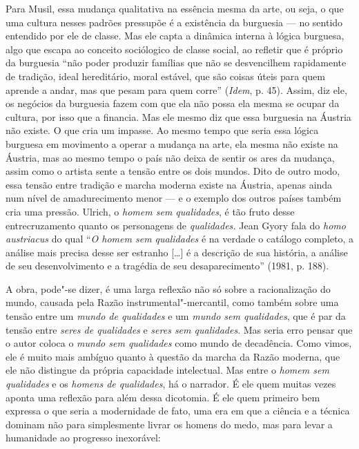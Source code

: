 Para Musil, essa mudança qualitativa na essência mesma da arte, ou seja,
o que uma cultura nesses padrões pressupõe é a existência da burguesia
--- no sentido entendido por ele de classe. Mas ele capta a dinâmica
interna à lógica burguesa, algo que escapa ao conceito sociólogico de classe
social, ao refletir que é próprio da burguesia ``não poder produzir famílias que
não se desvencilhem rapidamente de tradição, ideal hereditário, moral estável,
que são coisas úteis para quem aprende a andar, mas que pesam para quem
corre'' (\emph{Idem}, p. 45). Assim, diz ele, os negócios da burguesia
fazem com que ela não possa ela mesma se ocupar da cultura, por isso que
a financia. Mas ele mesmo diz que essa burguesia na Áustria não existe.
O que cria um impasse. Ao mesmo tempo que seria essa lógica burguesa em
movimento a operar a mudança na arte, ela mesma não existe na Áustria,
mas ao mesmo tempo o país não deixa de sentir os ares da mudança, assim
como o artista sente a tensão entre os dois mundos. Dito de outro modo,
essa tensão entre tradição e marcha moderna existe na Áustria, apenas
ainda num nível de amadurecimento menor --- e o exemplo dos outros países
também cria uma pressão. Ulrich, o \emph{homem sem qualidades}, é tão
fruto desse entrecruzamento quanto os personagens de \emph{qualidades.}
Jean Gyory fala do \emph{homo austriacus} do qual ``\emph{O homem sem
qualidades} é na verdade o catálogo completo, a análise mais precisa
desse ser estranho [\ldots{}] é a descrição de sua história, a
análise de seu desenvolvimento e a tragédia de seu desaparecimento''
(1981, p. 188).

A obra, pode"-se dizer, é uma larga reflexão não só sobre a
racionalização do mundo, causada pela Razão instrumental"-mercantil, como
também sobre uma tensão entre um \emph{mundo de qualidades} e um
\emph{mundo sem qualidades}, que é par da tensão entre \emph{seres de
qualidades} e \emph{seres sem qualidades}. Mas seria erro pensar que o
autor coloca o \emph{mundo sem qualidades} como mundo de decadência.
Como vimos, ele é muito mais ambíguo quanto à questão da marcha da Razão
moderna, que ele não distingue da própria capacidade intelectual. Mas
entre o \emph{homem sem qualidades} e os \emph{homens de qualidades}, há
o narrador. É ele quem muitas vezes aponta uma reflexão para além dessa
dicotomia. É ele quem primeiro bem expressa o que seria a modernidade de
fato, uma era em que a ciência e a técnica dominam não para simplesmente
livrar os homens do medo, mas para levar a humanidade ao progresso
inexorável:

